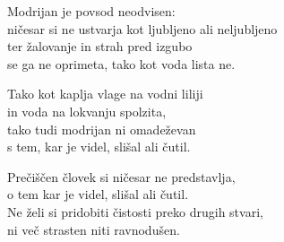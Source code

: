 Modrijan je povsod neodvisen:\\
ničesar si ne ustvarja kot ljubljeno ali neljubljeno\\
ter žalovanje in strah pred izgubo\\
se ga ne oprimeta, tako kot voda lista ne.

Tako kot kaplja vlage na vodni liliji\\
in voda na lokvanju spolzita,\\
tako tudi modrijan ni omadeževan\\
s tem, kar je videl, slišal ali čutil.

Prečiščen človek si ničesar ne predstavlja,\\
o tem kar je videl, slišal ali čutil.\\
Ne želi si pridobiti čistosti preko drugih stvari,\\
ni več strasten niti ravnodušen.

